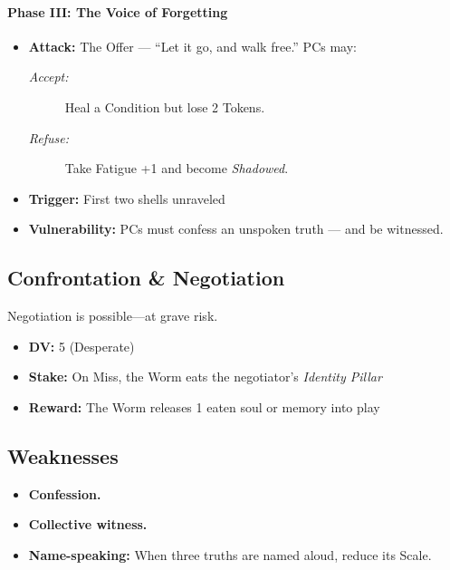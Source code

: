 \documentclass[11pt]{article}
\begin{document}
\begin{creature}
    \paragraph{Phase III: The Voice of Forgetting}
    \begin{itemize}
      \item \textbf{Attack:} The Offer --- ``Let it go, and walk free.'' PCs may:
        \begin{description}
           \item[\emph{Accept:}] Heal a Condition but lose 2 Tokens.
           \item[\emph{Refuse:}] Take Fatigue +1 and become \emph{Shadowed}.
        \end{description}
      \item \textbf{Trigger:} First two shells unraveled
      \item \textbf{Vulnerability:} PCs must confess an unspoken truth --- and be witnessed.
    \end{itemize}
    
    \vspace{6pt}
    
    \subsection*{Confrontation \& Negotiation}
    Negotiation is possible---at grave risk.
    
    \begin{itemize}
      \item \textbf{DV:} 5 (Desperate)
      \item \textbf{Stake:} On Miss, the Worm eats the negotiator's \emph{Identity Pillar}
      \item \textbf{Reward:} The Worm releases 1 eaten soul or memory into play
    \end{itemize}
    
    \vspace{6pt}
    
    \subsection*{Weaknesses}
    \begin{itemize}
      \item \textbf{Confession.}
      \item \textbf{Collective witness.}
      \item \textbf{Name-speaking:} When three truths are named aloud, reduce its Scale.
    \end{itemize}
    

\end{creature}
\end{document}
